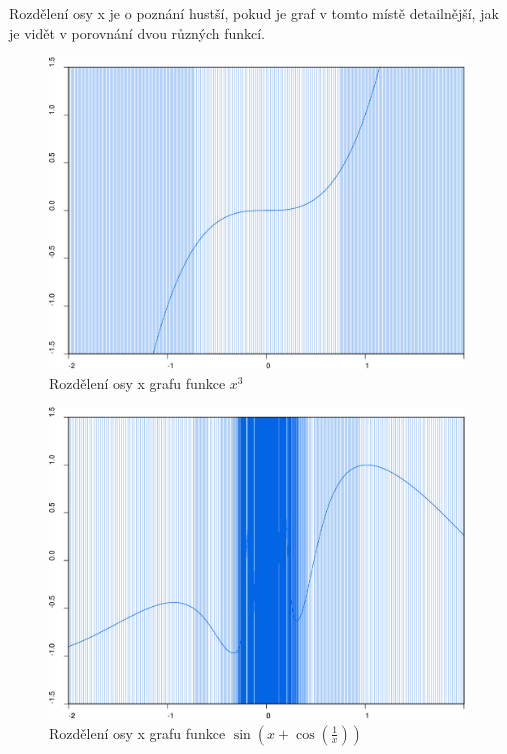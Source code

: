 \documentclass[11pt]{article}
\begin{document}
Rozdělení osy x je o poznání hustší, pokud je graf v tomto místě detailnější,
jak je vidět v porovnání dvou různých funkcí.

\begin{figure}[ht!]
\centering
	\includegraphics[width=11cm]{figures/figure2.eps}
	\caption{Rozdělení osy x grafu funkce $x^3$}
\end{figure}
\begin{figure}[ht!]
\centering
	\includegraphics[width=11cm]{figures/figure1.eps}
	\caption{Rozdělení osy x grafu funkce
		$\sin \left(x + \cos \left(\frac{1}{x} \right) \right)$}
\end{figure}
\end{document}
